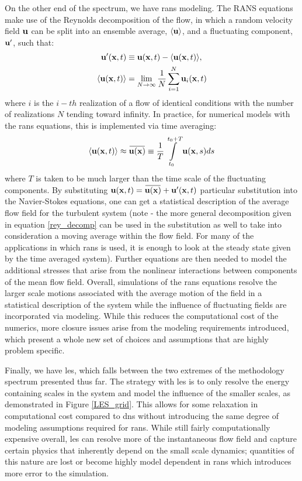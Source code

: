 On the other end of the spectrum, we have \gls{rans} modeling. The RANS equations make use of the Reynolds decomposition of the flow, in which a random velocity field $\vb{u}$ can be split into an ensemble average, $\langle \vb{u}\rangle$, and a fluctuating component, $\vb{u}'$, such that: 
\begin{equation}\label{rey_decomp}
\begin{aligned}
\vb{u}'(\vb{x},t) & \equiv \vb{u}(\vb{x}, t) - \langle \vb{u}(\vb{x}, t)\rangle, \\
\langle \vb{u}(\vb{x},t)\rangle & = \lim_{N \to \infty}\dfrac{1}{N} \sum\limits_{i=1}^{N} \vb{u}_i(\vb{x}, t)
\end{aligned}
\end{equation}   
where $i$ is the $i-th$ realization of a flow of identical conditions with the number of realizations $N$ tending toward infinity. In practice, for numerical models with the \gls{rans} equations, this is implemented via time averaging: 
$$\langle \vb{u}(\vb{x}, t) \rangle \approx \overbar{\vb{u}(\vb{x})} \equiv \dfrac{1}{T} \int\limits_{t_0}^{t_0+T} \vb{u}(\vb{x}, s) ds$$
where $T$ is taken to be much larger than the time scale of the fluctuating components. By substituting $\vb{u}(\vb{x},t) = \overbar{\vb{u}(\vb{x})} + \vb{u}'(\vb{x}, t)$ particular substitution into the Navier-Stokes equations, one can get a statistical description of the average flow field for the turbulent system (note - the more general decomposition given in equation \ref{rey_decomp} can be used in the substitution as well to take into consideration a moving average within the flow field. For many of the applications in which \gls{rans} is used, it is enough to look at the steady state given by the time averaged system). Further equations are then needed to model the additional stresses that arise from the nonlinear interactions between components of the mean flow field. Overall, simulations of the \gls{rans} equations resolve the larger scale motions associated with the average motion of the field in a statistical description of the system while the influence of fluctuating fields are incorporated via modeling. While this reduces the computational cost of the numerics, more closure issues arise from the modeling requirements introduced, which present a whole new set of choices and assumptions that are highly problem specific. 

Finally, we have \gls{les}, which falls between the two extremes of the methodology spectrum presented thus far. The strategy with \gls{les} is to only resolve the energy containing scales in the system and model the influence of the smaller scales, as demonstrated in Figure \ref{LES_grid}. This allows for some relaxation in computational cost compared to \gls{dns} without introducing the same degree of modeling assumptions required for \gls{rans}. While still fairly computationally expensive overall, \gls{les} can resolve more of the instantaneous flow field and capture certain physics that inherently depend on the small scale dynamics; quantities of this nature are lost or become highly model dependent in \gls{rans} which introduces more error to the simulation. 

